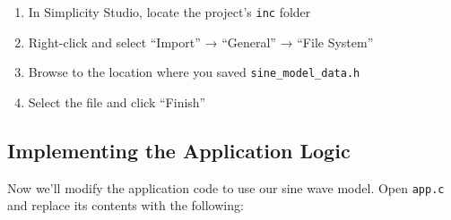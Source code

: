 \documentclass[
  9pt,
  letterpaper,
  abstract,
  titlepage]{scrbook}
\providecommand{\tightlist}{%
  \setlength{\itemsep}{0pt}\setlength{\parskip}{0pt}}\usepackage{longtable,booktabs,array}
\def\tightlist{}
\let\tightlist\relax
\begin{document}
\begin{enumerate}
\def\labelenumi{\arabic{enumi}.}
\tightlist
\item
  In Simplicity Studio, locate the project's \texttt{inc} folder
\item
  Right-click and select ``Import'' → ``General'' → ``File System''
\item
  Browse to the location where you saved \texttt{sine\_model\_data.h}
\item
  Select the file and click ``Finish''
\end{enumerate}

\subsection{Implementing the Application
Logic}\label{implementing-the-application-logic}

Now we'll modify the application code to use our sine wave model. Open
\texttt{app.c} and replace its contents with the following:
\end{document}
